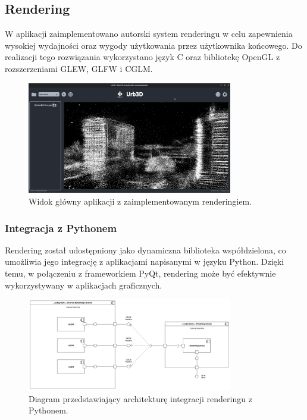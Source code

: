 \subsection{Rendering}

W aplikacji zaimplementowano autorski system renderingu w celu zapewnienia wysokiej wydajności oraz wygody użytkowania przez użytkownika końcowego. Do realizacji tego rozwiązania wykorzystano język C oraz bibliotekę OpenGL z rozszerzeniami GLEW, GLFW i CGLM.

\begin{figure}[h!]
    \centering
    \includegraphics[width=0.8\textwidth]{img/wizualizacja/ui_rendering.png}
    \caption{Widok główny aplikacji z zaimplementowanym renderingiem.}
    \label{fig:widok_glowny}
\end{figure}

\subsubsection{Integracja z Pythonem}
Rendering został udostępniony jako dynamiczna biblioteka współdzielona, co umożliwia jego integrację z aplikacjami napisanymi w języku Python. Dzięki temu, w połączeniu z frameworkiem PyQt, rendering może być efektywnie wykorzystywany w aplikacjach graficznych.

\begin{figure}[h!]
    \centering
    \includegraphics[width=0.8\textwidth]{img/diagramy/diagram_komp_rendering.png}
    \caption{Diagram przedstawiający architekturę integracji renderingu z Pythonem.}
    \label{fig:diagram}
\end{figure}

